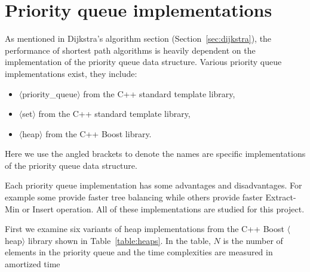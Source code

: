 \section{Priority queue implementations} \label{sec:pq_implementation}
As mentioned in Dijkstra's algorithm section (Section~\ref{sec:dijkstra}),
the performance of shortest path algorithms is heavily dependent on the implementation of the priority queue data structure.
Various priority queue implementations exist,
they include:
\begin{itemize}
    \item $\langle$priority\_queue$\rangle$ from the C++ standard template library,
    \item $\langle$set$\rangle$ from the C++ standard template library,
    \item $\langle$heap$\rangle$ from the C++ Boost library.
\end{itemize}
Here we use the angled brackets to denote the names are specific implementations of the priority queue data structure.

Each priority queue implementation has some advantages and disadvantages.
For example some provide faster tree balancing while others provide faster Extract-Min or Insert operation.
All of these implementations are studied for this project.

First we examine six variants of heap implementations from the C++ Boost $\langle$heap$\rangle$ library shown in Table~\ref{table:heaps}.
In the table, $N$ is the number of elements in the priority queue and
the time complexities are measured in amortized time

